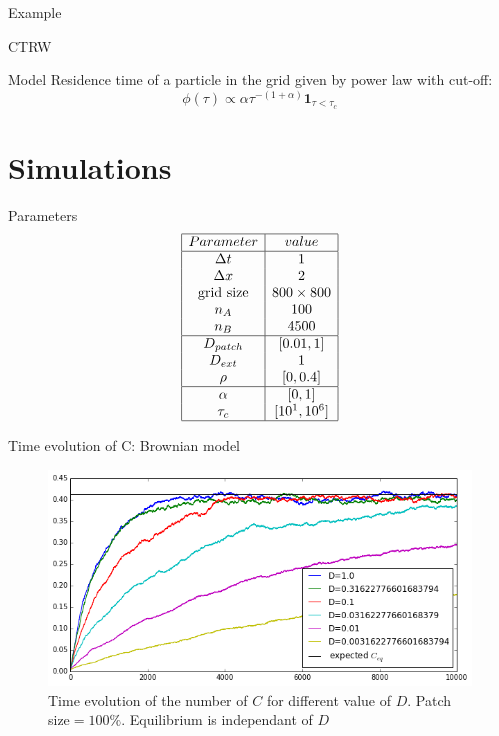 \documentclass{beamer}
\begin{document}
\begin{frame}
\begin{center}
\Huge \color{blue} Example
\end{center}
\end{frame}

\begin{frame}{CTRW}
\begin{block}{Model}
Residence time of a particle in the grid given by power law with cut-off: 
$$ \phi(\tau) \propto \alpha \tau^{-(1+\alpha)} \mathbf{1}_{\tau < \tau_c}$$
\end{block}

\end{frame}


\section{Simulations}

\begin{frame}{Parameters}
$$
\begin{array}{|c|c|}
\hline
Parameter & value \\
\hline
\Delta t & 1 \\
\Delta x & 2 \\
\text{grid size} & 800 \times 800 \\
n_A & 100 \\
n_B & 4500 \\
\hline
D_{patch} & [0.01, 1] \\
D_{ext} & 1 \\
\rho & [0, 0.4] \\
\hline
\alpha & [0,1] \\
\tau_c & [10^1, 10^6] \\
\hline
\end{array}
$$
\end{frame}

\begin{frame}{Time evolution of C: Brownian model}

\begin{figure}
\includegraphics[width=\textwidth]{C_Dvar}
\caption{Time evolution of the number of $C$ for different value of $D$. Patch size$=100\%$. Equilibrium is independant of $D$}
\end{figure}
\end{frame}
\end{document}
